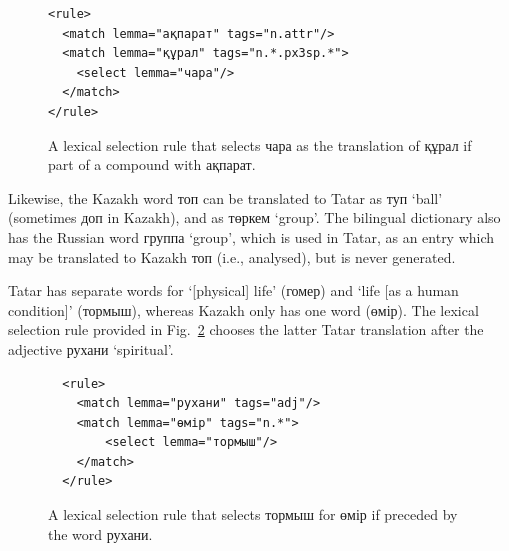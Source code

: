\documentclass[a4paper,11pt]{article}
\newcommand{\todo}[1]{}
\newcommand{\eng}[1]{`#1'}
\begin{document}
\begin{figure}
\begin{lstlisting}
<rule> 
  <match lemma="ақпарат" tags="n.attr"/> 
  <match lemma="құрал" tags="n.*.px3sp.*">
    <select lemma="чара"/>
  </match> 
</rule>
\end{lstlisting}
\todo{A couple more lexical-selection rules }
\caption{A lexical selection rule that selects чара as the translation of құрал if part of a compound with ақпарат.}
\label{fig:lrx}
\end{figure}

Likewise, the Kazakh word топ can be translated to Tatar as туп \eng{ball} (sometimes
доп in Kazakh), and as төркем \eng{group}.  The bilingual dictionary also has 
the Russian word группа \eng{group}, which is used in Tatar, as an entry which may be translated 
to Kazakh топ (i.e., analysed), but is never generated.

Tatar has separate words for \eng{[physical] life} (гомер) and \eng{life [as a human condition]} (тормыш), whereas Kazakh only has one word (өмір).  The lexical selection rule provided in Fig.~\ref{fig:lrx3} chooses the latter Tatar translation after the adjective рухани \eng{spiritual}.



\begin{figure}
\begin{lstlisting}
  <rule>
    <match lemma="рухани" tags="adj"/>
    <match lemma="өмір" tags="n.*">
        <select lemma="тормыш"/>
    </match>
  </rule>
\end{lstlisting}
\caption{A lexical selection rule that selects тормыш for өмір if preceded by the word рухани.}
\label{fig:lrx3}
\end{figure}
\end{document}

